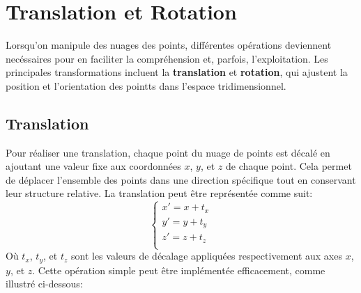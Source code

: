 \documentclass[../5RO17_TP4.tex]{subfiles}
\begin{document}
\section{Translation et Rotation}
\noindent Lorsqu'on manipule des nuages des points, différentes opérations deviennent necéssaires pour en faciliter la compréhension et, parfois, l'exploitation. Les principales transformations incluent la \textbf{translation} et \textbf{rotation}, qui ajustent la position et l'orientation des pointts dans l'espace tridimensionnel.


\subsection{Translation}
\noindent Pour réaliser une translation, chaque point du nuage de points est décalé en ajoutant une valeur fixe aux coordonnées $x$, $y$, et $z$ de chaque point. Cela permet de déplacer l’ensemble des points dans une direction spécifique tout en conservant leur structure relative. La translation peut être représentée comme suit:
\begin{equation}
    \begin{cases}
        x' = x + t_x\\
        y' = y + t_y\\
        z' = z + t_z\\
    \end{cases}
\end{equation}
\noindent Où $t_x$, $t_y$, et $t_z$ sont les valeurs de décalage appliquées respectivement aux axes $x$, $y$, et $z$. Cette opération simple peut être implémentée efficacement, comme illustré ci-dessous:\\
\end{document}
